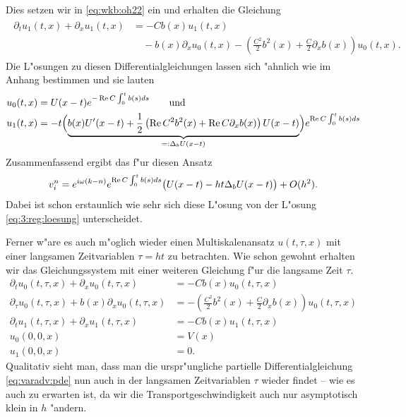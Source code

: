 Dies setzen wir in \eqref{eq:wkb:oh22} ein und erhalten die Gleichung
\begin{align}
\begin{split}\label{eq:wkb:oh222}
\partial_t u_1(t, x) + \partial_x u_1(t, x) &= - C b(x) u_1(t, x) \\
&\quad - b(x) \partial_x u_0(t, x) - \left( \frac{C^2}{2} b^2(x) + \frac{C}{2} \partial_x b(x) \right) u_0(t,x).
\end{split}
\end{align}
Die L"osungen zu diesen Differentialgleichungen lassen sich "ahnlich wie im Anhang bestimmen und sie lauten
\begin{align}
u_0(t,x) &= U(x-t) e^{- \operatorname{Re} C \int^t_0 b(s) ds } \qquad \text{und}\\
u_1(t,x) &= - t \Bigl( \underbrace{b(x) U'(x-t) + \frac{1}{2} \left( \operatorname{Re} C^2 b^2(x) + \operatorname{Re} C \partial_x b(x) \right) U(x-t)}_{=: \Delta_b U(x-t)} \Bigr) e^{ \operatorname{Re} C \int^t_0 b(s) ds } 
\end{align}
Zusammenfassend ergibt das f"ur diesen Ansatz
\begin{align}
v^n_i = e^{i \omega (k - n)}e^{ \operatorname{Re} C \int^t_0 b(s) ds } \bigl(  U(x-t) - h t \Delta_b U(x-t) \bigr) + O(h^2).
\end{align}
Dabei ist schon erstaunlich wie sehr sich diese L"osung von der L"osung \eqref{eq:3:reg:loesung} unterscheidet.

Ferner w"are es auch m"oglich wieder einen Multiskalenansatz $u(t,\tau,x)$ mit einer langsamen Zeitvariablen $\tau = h t$ zu betrachten.
Wie schon gewohnt erhalten wir das Gleichungssystem mit einer weiteren Gleichung f"ur die langsame Zeit $\tau$.
\begin{align}\label{eq:wkb:oh11}
\partial_t u_0(t, \tau, x) + \partial_x u_0(t, \tau, x)         &= - C b(x) u_0(t, \tau, x)\\
\partial_\tau u_0(t, \tau, x) + b(x) \partial_x u_0(t, \tau, x) &= - \left( \frac{C^2}{2} b^2(x) + \frac{C}{2} \partial_x b(x) \right) u_0(t, \tau, x)\\
\partial_t u_1(t, \tau, x) + \partial_x u_1(t, \tau, x)         &= - C b(x) u_1(t, \tau, x)\\
u_0(0,0,x) &= V(x)\\
u_1(0,0,x) &= 0.
\end{align}
Qualitativ sieht man, dass man die urspr"ungliche partielle Differentialgleichung \eqref{eq:varadv:pde} nun auch in der langsamen Zeitvariablen $\tau$ wieder findet -- wie es auch zu erwarten ist, da wir die Transportgeschwindigkeit auch nur asymptotisch klein in $h$ "andern.